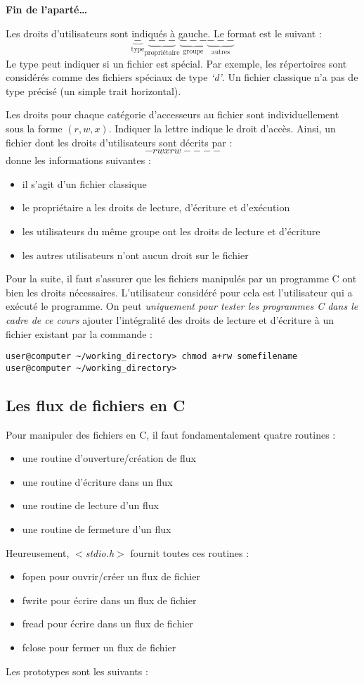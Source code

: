 \documentclass[../../../main.tex]{subfiles}
\begin{document}
\textbf{Fin de l'aparté\dots}
 
Les droits d'utilisateurs sont indiqués à gauche. Le format est le suivant :
$$\underbrace{-}_{\text{type}}\underbrace{---}_{\text{propriétaire}}\underbrace{---}_{\text{groupe}}\underbrace{---}_{\text{autres}}$$
Le type peut indiquer si un fichier est spécial. Par exemple, les répertoires sont considérés comme des fichiers spéciaux de type \textit{`d'}. Un fichier classique n'a pas de type précisé (un simple trait horizontal).
 
Les droits pour chaque catégorie d'accesseurs au fichier sont individuellement sous la forme $(r, w, x)$. Indiquer la lettre indique le droit d'accès. Ainsi, un fichier dont les droits d'utilisateurs sont décrits par :
$$-rwxrw----$$
donne les informations suivantes :
\begin{itemize}
	\item il s'agit d'un fichier classique
	\item le propriétaire a les droits de lecture, d'écriture et d'exécution
	\item les utilisateurs du même groupe ont les droits de lecture et d'écriture
	\item les autres utilisateurs n'ont aucun droit sur le fichier
\end{itemize}
Pour la suite, il faut s'assurer que les fichiers manipulés par un programme C ont bien les droits nécessaires. L'utilisateur considéré pour cela est l'utilisateur qui a exécuté le programme. On peut \textit{uniquement pour tester les programmes C dans le cadre de ce cours} ajouter l'intégralité des droits de lecture et d'écriture à un fichier existant par la commande :
\begin{verbatim}
user@computer ~/working_directory> chmod a+rw somefilename
user@computer ~/working_directory>
\end{verbatim}
\subsection{Les flux de fichiers en C}
Pour manipuler des fichiers en C, il faut fondamentalement quatre routines :
\begin{itemize}
	\item une routine d'ouverture/création de flux
	\item une routine d'écriture dans un flux
	\item une routine de lecture d'un flux
	\item une routine de fermeture d'un flux
\end{itemize}
Heureusement, \textit{$<$stdio.h$>$} fournit toutes ces routines :
\begin{itemize}
	\item \textsf{fopen} pour ouvrir/créer un flux de fichier
	\item \textsf{fwrite} pour écrire dans un flux de fichier
	\item \textsf{fread} pour écrire dans un flux de fichier
	\item \textsf{fclose} pour fermer un flux de fichier
\end{itemize}
Les prototypes sont les suivants :
\end{document}
